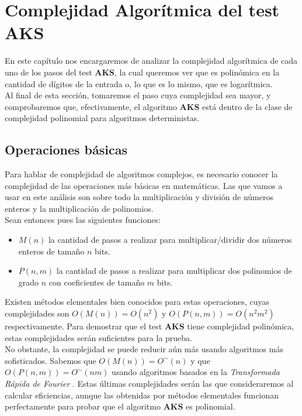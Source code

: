 \chapter{Complejidad Algorítmica del test AKS}

En este capítulo nos encargaremos de analizar la complejidad algorítmica de cada uno de los pasos del test \textbf{AKS}, la cual queremos ver que es polinómica en la cantidad de dígitos de la entrada o, lo que es lo mismo, que es logarítmica.\\

Al final de esta sección, tomaremos el paso cuya complejidad sea mayor, y comprobaremos que, efectivamente, el algoritmo \textbf{AKS} está dentro de la clase de complejidad polinomial para algoritmos deterministas.

\section{Operaciones básicas}

Para hablar de complejidad de algoritmos complejos, es necesario conocer la complejidad de las operaciones más básicas en matemáticas. Las que vamos a usar en este análisis son sobre todo la multiplicación y división de números enteros y la multiplicación de polinomios.\\

Sean entonces pues las siguientes funciones:\\

\begin{itemize}
	\item $M(n)$ la cantidad de pasos a realizar para multiplicar/dividir dos números enteros de tamaño $n$ bits.
	
	\item $P(n, m)$ la cantidad de pasos a realizar para multiplicar dos polinomios de grado $n$ con coeficientes de tamaño $m$ bits.
\end{itemize}

Existen métodos elementales bien conocidos para estas operaciones, cuyas complejidades son $O(M(n)) = O(n^2)$ y $O(P(n, m)) = O(n^2m^2)$ respectivamente. Para demostrar que el test \textbf{AKS} tiene complejidad polinómica, estas complejidades serán suficientes para la prueba.\\

No obstante, la complejidad se puede reducir aún más usando algoritmos más sofisticados. Sabemos que $O(M(n)) = O^\sim(n)$ y que $O(P(n, m)) = O^\sim(nm)$ usando algoritmos basados en la \textit{Transformada Rápida de Fourier} \cite{modern_computer_algebra}. Estas últimas complejidades serán las que consideraremos al calcular eficiencias, aunque las obtenidas por métodos elementales funcionan perfectamente para probar que el algoritmo \textbf{AKS} es polinomial.

